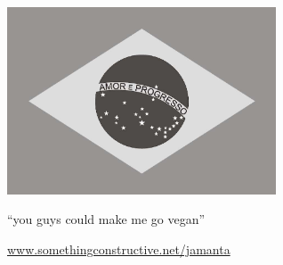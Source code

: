\begin{center}

  \includegraphics[width=8cm]{brasil.jpg}

  \bigskip

  \LARGE{``you guys could make me go vegan''}

  \bigskip
  \bigskip

  \large{\href{http://www.somethingconstructive.net/jamanta}{www.somethingconstructive.net/jamanta}}

\end{center}
